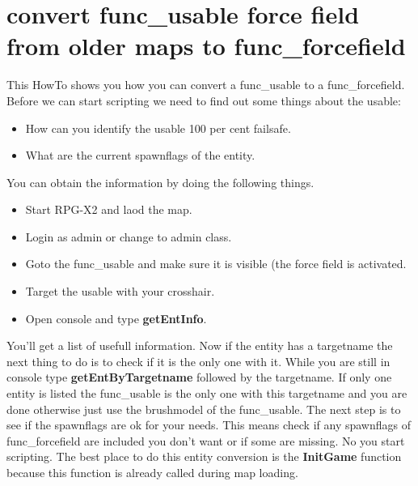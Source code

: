 \documentclass{scrreprt}
\begin{document}
\section{convert func\_usable force field from older maps to func\_forcefield}
\label{howto-usabletoforcefield}
This HowTo shows you how you can convert a func\_usable to a func\_forcefield. Before we can start scripting we need to find out some things about the usable: 
\begin{itemize}
    \item How can you identify the usable 100 per cent failsafe.
    \item What are the current spawnflags of the entity.
\end{itemize}
You can obtain the information by doing the following things.
\begin{itemize}
    \item Start RPG-X2 and laod the map.
    \item Login as admin or change to admin class.
    \item Goto the func\_usable and make sure it is visible (the force field is activated.
    \item Target the usable with your crosshair.
    \item Open console and type \textbf{getEntInfo}.
\end{itemize}
You'll get a list of usefull information. Now if the entity has a targetname the next thing to do is to check if it is the only one with it. While you are still in console type \textbf{getEntByTargetname} followed by the targetname.
If only one entity is listed the func\_usable is the only one with this targetname and you are done otherwise just use the brushmodel of the func\_usable.
The next step is to see if the spawnflags are ok for your needs. This means check if any spawnflags of func\_forcefield are included you don't want or if some are missing.
No you start scripting. The best place to do this entity conversion is the \textbf{InitGame} function because this function is already called during map loading.


\end{document}
